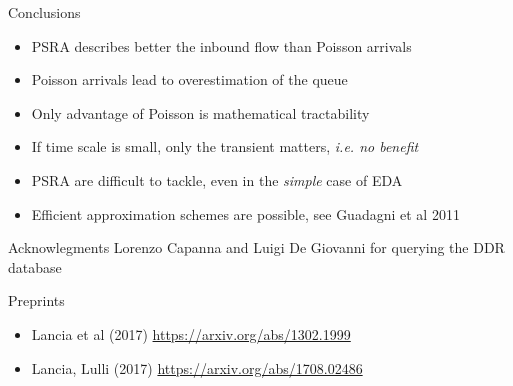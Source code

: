 \documentclass[table,aspectratio=169]{beamer}
\begin{document}
\begin{frame}{Conclusions}
    \begin{itemize}
        \item PSRA describes better the inbound flow than Poisson arrivals
        \item Poisson arrivals lead to \alert{overestimation of the queue}
        \item Only advantage of Poisson is mathematical tractability
        \item If time scale is small, \alert{only the transient matters, \emph{i.e. no benefit}}
        \item PSRA are difficult to tackle, even in the \emph{simple} case of EDA
        \item Efficient approximation schemes are possible, see Guadagni et al 2011
    \end{itemize}

    \begin{alertblock}{Acknowlegments}
        Lorenzo Capanna and Luigi De Giovanni for querying the DDR database
    \end{alertblock}

    \begin{alertblock}{Preprints}
        \begin{itemize}
            \item Lancia et al (2017) \url{https://arxiv.org/abs/1302.1999}
            \item Lancia, Lulli (2017) \url{https://arxiv.org/abs/1708.02486}
        \end{itemize}
    \end{alertblock}
\end{frame}
\end{document}
